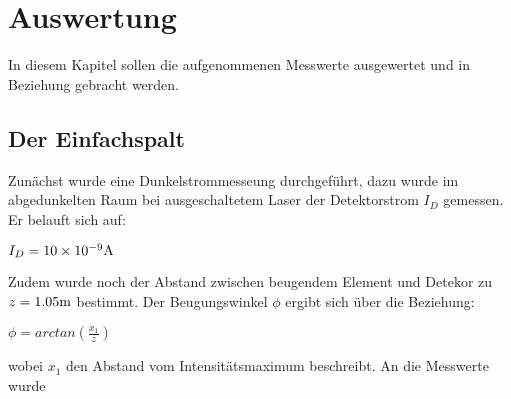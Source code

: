 \section{Auswertung}
\label{sec:auswertung}
In diesem Kapitel sollen die aufgenommenen Messwerte ausgewertet und in Beziehung gebracht werden.

\subsection{Der Einfachspalt}
\label{sec:einfachspalt}
Zunächst wurde eine Dunkelstrommesseung durchgeführt, dazu wurde im abgedunkelten Raum bei ausgeschaltetem
Laser der Detektorstrom $I_D$ gemessen. Er belauft sich auf:
\begin{center}
    $I_D=10\times 10^{-9}\si[]{A}$
\end{center}
Zudem wurde noch der Abstand zwischen beugendem Element und Detekor zu $z=1.05\si[]{m}$ bestimmt.
Der Beugungswinkel $\phi$ ergibt sich über die Beziehung:
\begin{center}
    $\phi=arctan(\frac{x_1}{z})$
\end{center}
wobei $x_1$ den Abstand vom Intensitätsmaximum beschreibt.
An die Messwerte wurde